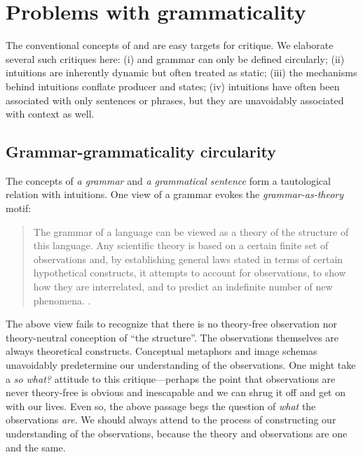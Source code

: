 \section{Problems with grammaticality}

The conventional concepts of  and  are easy targets for critique. We elaborate several such critiques here: (i)  and grammar can only be defined circularly; (ii) intuitions are inherently dynamic but often treated as static; (iii) the mechanisms behind  intuitions conflate producer and  states; (iv) intuitions have often been associated with only sentences or phrases, but they are unavoidably associated with context as well.

\subsection{Grammar-grammaticality circularity}

The concepts of \textit{a grammar} and \textit{a grammatical sentence} form a tautological relation with  intuitions. One view of a grammar evokes the \textit{grammar-as-theory} motif:

\begin{quote}
The grammar of a language can be viewed as a theory of the structure of this language. Any scientific theory is based on a certain finite set of observations and, by establishing general laws stated in terms of certain hypothetical constructs, it attempts to account for observations, to show how they are interrelated, and to predict an indefinite number of new phenomena. \citep[113]{Chomsky1956}.
\end{quote}

  The above view fails to recognize that there is no theory-free observation nor theory-neutral conception of “the structure”. The observations themselves are always theoretical constructs. Conceptual metaphors and image schemas unavoidably predetermine our understanding of the observations. One might take a \textit{so what?} attitude to this critique—perhaps the point that observations are never theory-free is obvious and inescapable and we can shrug it off and get on with our lives. Even so, the above passage begs the question of \textit{what} the observations \textit{are}. We should always attend to the process of constructing our understanding of the observations, because the theory and observations are one and the same.

